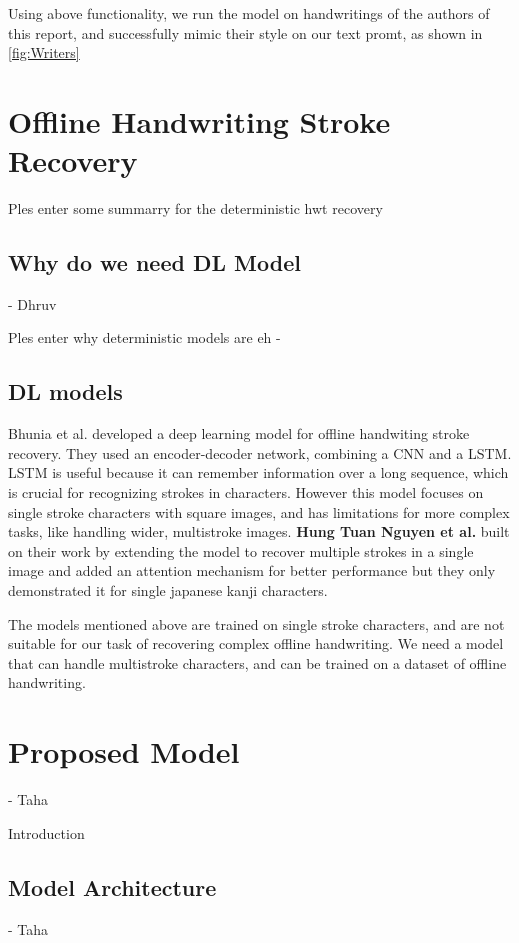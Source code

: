 \documentclass[10pt,twocolumn,letterpaper]{article}
\begin{document}
Using above functionality, we run the model on handwritings of the authors of this report, and successfully mimic their style on our text promt, as shown in \ref{fig:Writers} 

\section{Offline Handwriting Stroke Recovery}  

Ples enter some summarry for the deterministic hwt recovery

\subsection{Why do we need DL Model}  - Dhruv

Ples enter why deterministic models are eh - 

\subsection{DL models}
Bhunia et al. \cite{image2stroke-1Char} developed a deep learning model for offline handwiting stroke recovery. They used an encoder-decoder network, combining a CNN and a LSTM. LSTM is useful because it can remember information over a long sequence, which is crucial for recognizing strokes in characters. However this model focuses on single stroke characters with square images, and has limitations for more complex tasks, like handling wider, multistroke images. \textbf{Hung Tuan Nguyen et al.} built on their work by extending the model to recover multiple strokes in a single image and added an attention mechanism for better performance but they only demonstrated it for single japanese kanji characters.  

The models mentioned above are trained on single stroke characters, and are not suitable for our task of recovering complex offline handwriting. We need a model that can handle multistroke characters, and can be trained on a dataset of offline handwriting.

\section{Proposed Model} - Taha

Introduction 

\subsection{Model Architecture} - Taha
\end{document}
